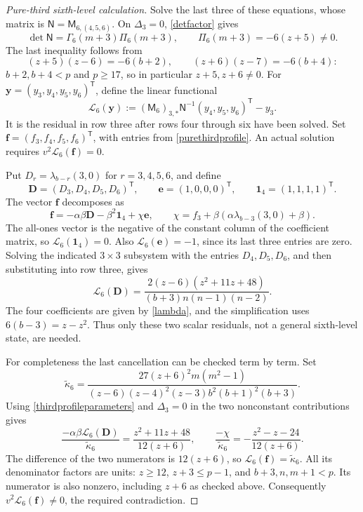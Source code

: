 \documentclass[10pt,a4paper]{amsart}
\begin{document}
\begin{proof}[Pure-third sixth-level calculation]
Solve the last three of these equations, whose matrix is
$\mathsf N=\mathsf M_{6,(4,5,6)}$.  On $\Delta_3=0$, \eqref{detfactor} gives
\[
 \det\mathsf N=\Gamma_6(m+3)\Pi_6(m+3),\qquad
 \Pi_6(m+3)=-6(z+5)\ne0.
\]
The last inequality follows from
\[
 (z+5)(z-6)=-6(b+2),\qquad
 (z+6)(z-7)=-6(b+4):
\]
$b+2,b+4<p$ and $p\ge17$, so in particular $z+5,z+6\ne0$.
For $\mathbf y=(y_3,y_4,y_5,y_6)^{\mathsf T}$, define the linear
functional
\[
 \mathcal L_6(\mathbf y):=(\mathsf M_6)_{3,*}\mathsf N^{-1}
      (y_4,y_5,y_6)^{\mathsf T}-y_3.
\]
It is the residual in row three after rows four through six have been
solved.  Set $\mathbf f=(f_3,f_4,f_5,f_6)^{\mathsf T}$, with entries
from \eqref{purethirdprofile}.  An actual solution requires
$v^2\mathcal L_6(\mathbf f)=0$.

Put $D_r=\lambda_{b-r}(3,0)$ for $r=3,4,5,6$, and define
\[
 \mathbf D=(D_3,D_4,D_5,D_6)^{\mathsf T},\qquad
 \mathbf e=(1,0,0,0)^{\mathsf T},\qquad
 \mathbf 1_4=(1,1,1,1)^{\mathsf T}.
\]
The vector $\mathbf f$ decomposes as
\[
 \mathbf f=-\alpha\beta\mathbf D-\beta^2\mathbf 1_4+\chi\mathbf e,\qquad
 \chi=f_3+\beta(\alpha\lambda_{b-3}(3,0)+\beta).
\]
The all-ones vector is the negative of the constant column of the
coefficient matrix, so
$\mathcal L_6(\mathbf 1_4)=0$.  Also $\mathcal L_6(\mathbf e)=-1$, since its last
three entries are zero.  Solving the indicated $3\times3$ subsystem with the entries $D_4,D_5,D_6$, and then substituting into row three, gives
\[
 \mathcal L_6(\mathbf D)=\frac{2(z-6)(z^2+11z+48)}
                       {(b+3)n(n-1)(n-2)}.
\]
The four coefficients are given by \eqref{lambda}, and the
simplification uses $6(b-3)=z-z^2$.  Thus only these two scalar
residuals, not a general sixth-level state, are needed.

For completeness the last cancellation can be checked term by term.
Set
\begin{equation}\label{vK6}
 \widetilde\kappa_6=
 \frac{27(z+6)^2m(m^2-1)}
 {(z-6)(z-4)^2(z-3)b^2(b+1)^2(b+3)}.
\end{equation}
Using \eqref{thirdprofileparameters} and $\Delta_3=0$ in the two
nonconstant contributions gives
\[
 \frac{-\alpha\beta\mathcal L_6(\mathbf D)}{\widetilde\kappa_6}
       =\frac{z^2+11z+48}{12(z+6)},\qquad
 \frac{-\chi}{\widetilde\kappa_6}
       =-\frac{z^2-z-24}{12(z+6)}.
\]
The difference of the two numerators is $12(z+6)$, so
$\mathcal L_6(\mathbf f)=\widetilde\kappa_6$.  All its denominator factors are
units: $z\ge12$, $z+3\le p-1$, and $b+3,n,m+1<p$.
Its numerator is also nonzero, including $z+6$ as checked above.
Consequently $v^2\mathcal L_6(\mathbf f)\ne0$, the required contradiction.
\end{proof}
\end{document}
